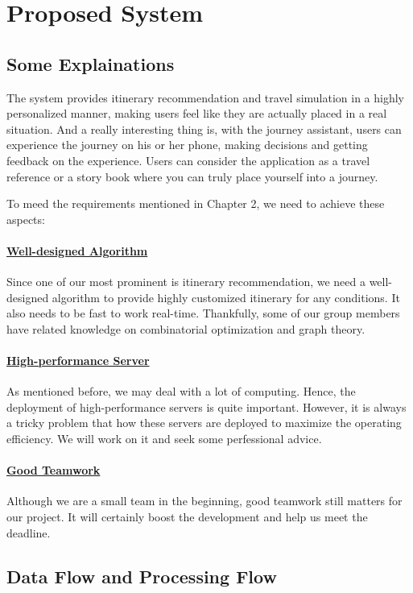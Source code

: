 \documentclass[10pt]{article}
\begin{document}
\section{Proposed System}
\subsection{Some Explainations}
The system provides itinerary recommendation and travel simulation in a highly personalized manner, making users feel like they are actually placed in a real situation. And a really interesting thing is, with the journey assistant, users can experience the journey on his or her phone, making decisions and getting feedback on the experience. Users can consider the application as a travel reference or a story book where you can truly place yourself into a journey.

To meed the requirements mentioned in Chapter 2, we need to achieve these aspects:

\paragraph{\underline{Well-designed Algorithm}}
Since one of our most prominent is itinerary recommendation, we need a well-designed algorithm to provide highly customized itinerary for any conditions. It also needs to be fast to work real-time. Thankfully, some of our group members have related knowledge on combinatorial optimization and graph theory.

\paragraph{\underline{High-performance Server}}
As mentioned before, we may deal with a lot of computing. Hence, the deployment of high-performance servers is quite important. However, it is always a tricky problem that how these servers are deployed to maximize the operating efficiency. We will work on it and seek some perfessional advice.

\paragraph{\underline{Good Teamwork}}
Although we are a small team in the beginning, good teamwork still matters for our project. It will certainly boost the development and help us meet the deadline.

\subsection{Data Flow and Processing Flow}
\end{document}
